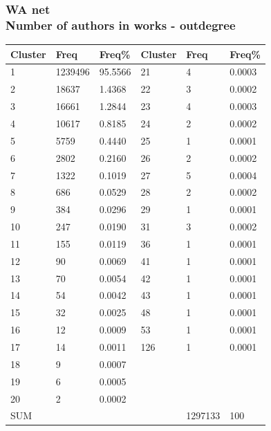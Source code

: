 \documentclass[hyperref={pdfstartview={FitBH -32768},
                         pdfpagemode=FullScreen,
                         plainpages=false,
                         colorlinks=true}
              ]{beamer}
\begin{document}
\begin{frame}[fragile]
\frametitle{WA net \label{numpap}\\ \normalsize Number of authors in works - outdegree}
\renewcommand{\arraystretch}{0.85}
\tiny
\begin{center}
\begin{tabular}{l|l|l||l|l|l}
Cluster&  	Freq&  	Freq\% &  	Cluster&   Freq &	Freq\%\\ \hline   
1&  	1239496&  	95.5566&  	21&  	4&  	0.0003\\
2&  	18637&  	1.4368&  	22&  	3&  	0.0002\\
3&  	16661&  	1.2844&  	23&  	4&  	0.0003\\
4&  	10617&  	0.8185&  	24&  	2&  	0.0002\\
5&  	5759&  	0.4440&  	25&  	1&  	0.0001\\
6&  	2802&  	0.2160&  	26&  	2&  	0.0002\\
7&  	1322&  	0.1019&  	27&  	5&  	0.0004\\
8&  	686&  	0.0529&  	28&  	2&  	0.0002\\
9&  	384&  	0.0296&  	29&  	1&  	0.0001\\
10&  	247&  	0.0190&  	31&  	3&  	0.0002\\
11&  	155&  	0.0119&  	36&  	1&  	0.0001\\
12&  	90&  	0.0069&  	41&  	1&  	0.0001\\
13&  	70&  	0.0054&  	42&  	1&  	0.0001\\
14&  	54&  	0.0042&  	43&  	1&  	0.0001\\
15&  	32&  	0.0025&  	48&  	1&  	0.0001\\
16&  	12&  	0.0009&  	53&  	1&  	0.0001\\
17&  	14&  	0.0011&  	126&  	1&  	0.0001\\
18&  	9&  	0.0007&  	  & 	 & 	\\
19&  	6&  	0.0005&  	 &	 &	\\
20&  	2&  	0.0002&  	&	 &	\\ \hline
SUM &     &              &       &  1297133 & 100  \\ \hline   
\end{tabular}
\end{center}
\medskip

\footnotesize


\end{frame}
\end{document}
